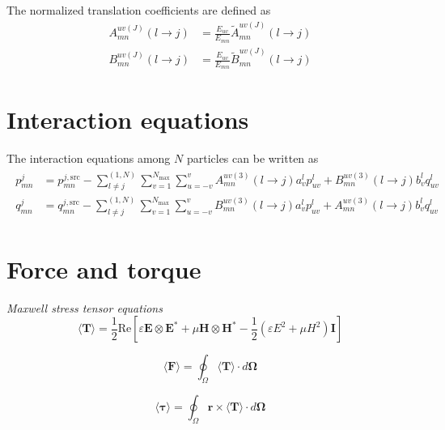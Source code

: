 \documentclass[11pt]{article}
\begin{document}
The normalized translation coefficients are defined as
\begin{subequations}
\begin{align}
    A_{mn}^{uv(J)}(l \rightarrow j) &= \frac{E_{uv}}{E_{mn}} \widetilde{A}_{mn}^{uv(J)}(l \rightarrow j) \\
    B_{mn}^{uv(J)}(l \rightarrow j) &= \frac{E_{uv}}{E_{mn}} \widetilde{B}_{mn}^{uv(J)}(l \rightarrow j)
\end{align}
\end{subequations}


\section{Interaction equations}
The interaction equations among $N$ particles can be written as
\begin{align}
    \begin{split}
        p_{mn}^j &= p_{mn}^{j,\text{src}}  -  \sum_{l \neq j}^{(1,N)}\sum_{v=1}^{N_\text{max}} \sum_{u=-v}^{v}
    A_{mn}^{uv(3)}(l \rightarrow j) a_v^l p_{uv}^{l}
    +B_{mn}^{uv(3)}(l \rightarrow j) b_v^l q_{uv}^{l} \\
    q_{mn}^j &= q_{mn}^{j,\text{src}}  -  \sum_{l \neq j}^{(1,N)}\sum_{v=1}^{N_\text{max}} \sum_{u=-v}^{v}
    B_{mn}^{uv(3)}(l \rightarrow j) a_v^l p_{uv}^{l}
    +A_{mn}^{uv(3)}(l \rightarrow j) b_v^l q_{uv}^{l}
    \label{eqn:gmt_system}
    \end{split}
\end{align}

\section{Force and torque}
\emph{Maxwell stress tensor equations}
\begin{equation}
    \langle \boldsymbol{T} \rangle = \frac{1}{2} \text{Re} \left[ \varepsilon  \boldsymbol{E} \otimes \boldsymbol{E^*} + \mu \boldsymbol{H} \otimes \boldsymbol{H^*}
    - \frac{1}{2}(\varepsilon E^2 + \mu H^2)\boldsymbol{I} \right]
\end{equation}

\begin{equation}
    \langle \boldsymbol{F} \rangle = \oint_\Omega \langle \boldsymbol{T} \rangle \cdot d \boldsymbol{\Omega}
\end{equation}

\begin{equation}
    \langle \boldsymbol{\tau} \rangle = \oint_\Omega \boldsymbol{r} \times \langle \boldsymbol{T}  \rangle \cdot d \boldsymbol{\Omega}
\end{equation}
\end{document}
